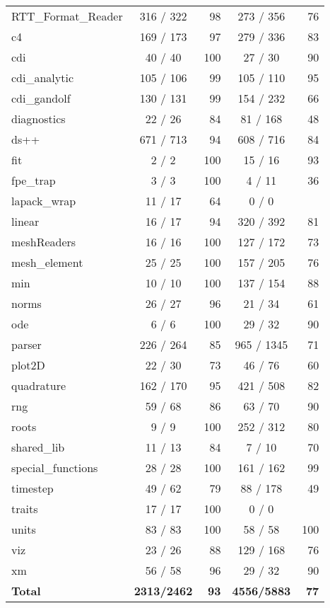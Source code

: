 \begin{table}
\begin{center}
\begin{tabular}{lcrcr}
RTT\_Format\_Reader &   316 /   322 &  98 &    273 /   356 &  76 \\
c4                  &   169 /   173 &  97 &    279 /   336 &  83 \\
cdi                 &    40 /    40 & 100 &     27 /    30 &  90 \\
cdi\_analytic       &   105 /   106 &  99 &    105 /   110 &  95 \\
cdi\_gandolf        &   130 /   131 &  99 &    154 /   232 &  66 \\
diagnostics         &    22 /     26 &  84 &     81 /   168 &  48 \\
ds++                &   671 /    713 &  94 &    608 /   716 &  84 \\
fit                 &     2 /     2  & 100 &     15 /    16 &  93 \\
fpe\_trap  &              3 /     3  & 100 &      4 /    11 &  36 \\
lapack\_wrap   &         11 /    17  &  64 &      0 /     0 & \\
linear  &                16 /    17  &  94 &    320 /   392 &  81 \\
meshReaders  &           16 /    16  & 100 &    127 /   172 &  73 \\
mesh\_element  &         25 /    25  & 100 &    157 /   205 &  76 \\
min  &                   10 /    10  & 100 &    137 /   154 &  88 \\
norms  &                 26 /    27  &  96 &     21 /    34 &  61 \\
ode  &                    6 /     6  & 100 &     29 /    32 &  90 \\
parser  &               226 /   264  &  85 &    965 /  1345 &  71 \\
plot2D  &                22 /    30  &  73 &     46 /    76 &  60 \\
quadrature  &           162 /   170  &  95 &    421 /   508 &  82 \\
rng  &                   59 /    68  &  86 &     63 /    70 &  90 \\
roots  &                  9 /     9  & 100 &    252 /   312 &  80 \\
shared\_lib  &           11 /    13  &  84 &      7 /    10 &  70 \\
special\_functions  &    28 /    28  & 100 &    161 /   162 &  99 \\
timestep  &              49 /    62  &  79 &     88 /   178 &  49 \\
traits  &                17 /    17  & 100 &      0 /     0 & \\
units  &                 83 /    83  & 100 &     58 /    58 & 100 \\
viz  &                   23 /    26  &  88 &    129 /   168 &  76 \\
xm  &                    56 /    58  &  96 &     29 /    32 &  90 \\
      \hline
      {\bf Total} & {\bf 2313/2462} & {\bf 93} & {\bf 4556/5883} & {\bf 77} \\


\end{tabular}
\end{center}
\end{table}

